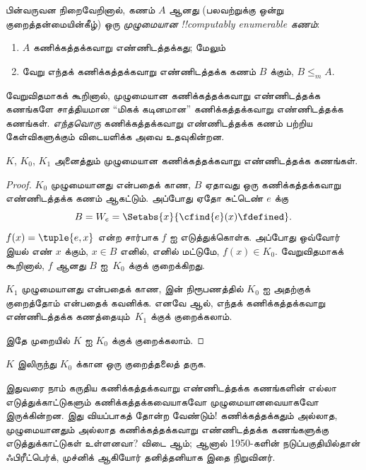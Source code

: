 \documentclass[../../../include/open-logic-section]{subfiles}
\begin{document}


\begin{defn}
பின்வருவன நிறைவேறினால், கணம் $A$ ஆனது (பலவற்றுக்கு ஒன்று
குறைத்தன்மையின்கீழ்) ஒரு
\emph{முழுமையான !!{computably enumerable} கணம்}:
\begin{enumerate}
\item $A$ கணிக்கத்தக்கவாறு எண்ணிடத்தக்கது; மேலும்
\item வேறு எந்தக் கணிக்கத்தக்கவாறு எண்ணிடத்தக்க கணம் $B$ க்கும்,
  $B \leq_m A$.
\end{enumerate}
\end{defn}

வேறுவிதமாகக் கூறினால், முழுமையான கணிக்கத்தக்கவாறு எண்ணிடத்தக்க
கணங்களே சாத்தியமான ``மிகக் கடினமான'' கணிக்கத்தக்கவாறு
எண்ணிடத்தக்க கணங்கள். \emph{எந்தவொரு} கணிக்கத்தக்கவாறு
எண்ணிடத்தக்க கணம் பற்றிய கேள்விகளுக்கும் விடையளிக்க அவை உதவுகின்றன.

\begin{thm}
$K$, $K_0$, $K_1$ அனைத்தும் முழுமையான கணிக்கத்தக்கவாறு
எண்ணிடத்தக்க கணங்கள்.
\end{thm}

\begin{proof}
$K_0$ முழுமையானது என்பதைக் காண, $B$ ஏதாவது ஒரு கணிக்கத்தக்கவாறு
எண்ணிடத்தக்க கணம் ஆகட்டும். அப்போது ஏதோ சுட்டெண் $e$ க்கு
\[
B = W_e = \Setabs{x}{\cfind{e}(x) \fdefined}.
\]
$f(x) = \tuple{e, x}$ என்ற சார்பாக $f$ ஐ எடுத்துக்கொள்க.
அப்போது ஒவ்வோர் இயல் எண் $x$ க்கும், $x \in B$ எனில், எனில்
மட்டுமே, $f(x) \in K_0$. வேறுவிதமாகக் கூறினால், $f$ ஆனது $B$
ஐ~$K_0$ க்குக் குறைக்கிறது.

$K_1$ முழுமையானது என்பதைக் காண,  இன்
நிரூபணத்தில் $K_0$ ஐ அதற்குக் குறைத்தோம் என்பதைக் கவனிக்க.
எனவே  ஆல், எந்தக் கணிக்கத்தக்கவாறு
எண்ணிடத்தக்க கணத்தையும்~$K_1$ க்குக் குறைக்கலாம்.

இதே முறையில் $K$ ஐ $K_0$ க்குக் குறைக்கலாம்.
\end{proof}

\begin{prob}
$K$ இலிருந்து $K_0$ க்கான ஒரு குறைத்தலைத் தருக.
\end{prob}

\begin{digress}
இதுவரை நாம் கருதிய கணிக்கத்தக்கவாறு எண்ணிடத்தக்க கணங்களின் எல்லா
எடுத்துக்காட்டுகளும் கணிக்கத்தக்கவையாகவோ முழுமையானவையாகவோ
இருக்கின்றன. இது வியப்பாகத் தோன்ற வேண்டும்!{} கணிக்கத்தக்கதும்
அல்லாத, முழுமையானதும் அல்லாத கணிக்கத்தக்கவாறு எண்ணிடத்தக்க
கணங்களுக்கு எடுத்துக்காட்டுகள் உள்ளனவா? விடை ஆம்; ஆனால் 1950-களின்
நடுப்பகுதியில்தான் ஃபிரீட்பெர்க், முச்னிக் ஆகியோர் தனித்தனியாக
இதை நிறுவினர்.
\end{digress}
\end{document}
